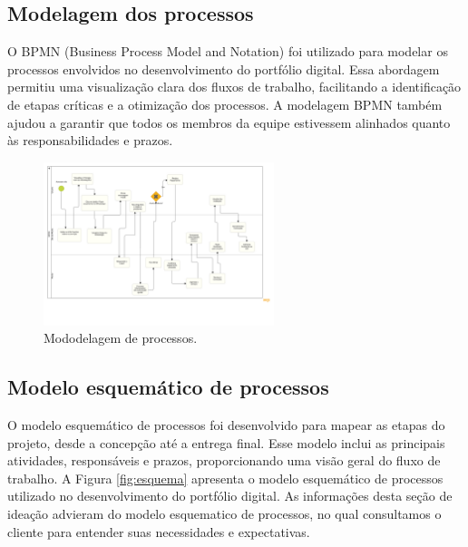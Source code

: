 
\subsection{Modelagem dos processos}

 O BPMN (Business Process Model and Notation) foi utilizado para modelar os processos envolvidos no desenvolvimento do portfólio digital. Essa abordagem permitiu uma visualização clara dos fluxos de trabalho, facilitando a identificação de etapas críticas e a otimização dos processos. A modelagem BPMN também ajudou a garantir que todos os membros da equipe estivessem alinhados quanto às responsabilidades e prazos.

 \begin{figure}[H]
    \centering
    \includegraphics[width=0.6\textwidth]{Figures/BPMN.pdf} %
    \caption{Mododelagem de processos.}
    \label{fig:esquema-bpmn}
\end{figure}

\subsection{Modelo esquemático de processos}

 O modelo esquemático de processos foi desenvolvido para mapear as etapas do projeto, desde a concepção até a entrega final. Esse modelo inclui as principais atividades, responsáveis e prazos, proporcionando uma visão geral do fluxo de trabalho. A Figura \ref{fig:esquema} apresenta o modelo esquemático de processos utilizado no desenvolvimento do portfólio digital. As informações desta seção de ideação advieram do modelo esquematico de processos, no qual consultamos o cliente para entender suas necessidades e expectativas.

